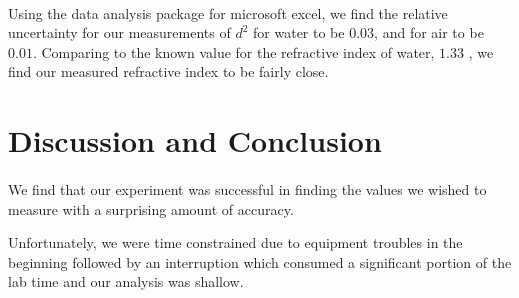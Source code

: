 \documentclass{article}
\begin{document}
\paragraph{}
Using the data analysis package for microsoft excel, we find the relative uncertainty for our measurements of $d^2$ for water to be $0.03$, and for air to be $0.01$. Comparing to the known value for the refractive index of water, $1.33$ \autocite{mohr_2016}, we find our measured refractive index to be fairly close.

\section{Discussion and Conclusion}
\paragraph{}
We find that our experiment was successful in finding the values we wished to measure with a surprising amount of accuracy.

Unfortunately, we were time constrained due to equipment troubles in the beginning followed by an interruption which consumed a significant portion of the lab time and our analysis was shallow.


\printbibliography
\end{document}
